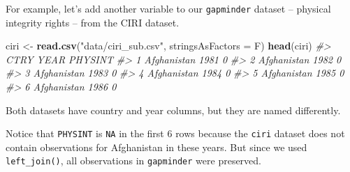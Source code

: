 \documentclass[]{book}
\newenvironment{Shaded}{\begin{snugshade}}{\end{snugshade}}
\newcommand{\KeywordTok}[1]{\textcolor[rgb]{0.13,0.29,0.53}{\textbf{#1}}}
\newcommand{\DataTypeTok}[1]{\textcolor[rgb]{0.13,0.29,0.53}{#1}}
\newcommand{\StringTok}[1]{\textcolor[rgb]{0.31,0.60,0.02}{#1}}
\newcommand{\CommentTok}[1]{\textcolor[rgb]{0.56,0.35,0.01}{\textit{#1}}}
\newcommand{\OperatorTok}[1]{\textcolor[rgb]{0.81,0.36,0.00}{\textbf{#1}}}
\newcommand{\NormalTok}[1]{#1}
\begin{document}
For example, let's add another variable to our \texttt{gapminder}
dataset -- physical integrity rights -- from the CIRI dataset.

\begin{Shaded}
\begin{Highlighting}[]
\NormalTok{ciri <-}\StringTok{ }\KeywordTok{read.csv}\NormalTok{(}\StringTok{"data/ciri_sub.csv"}\NormalTok{, }\DataTypeTok{stringsAsFactors =}\NormalTok{ F)}
\KeywordTok{head}\NormalTok{(ciri)}
\CommentTok{#>          CTRY YEAR PHYSINT}
\CommentTok{#> 1 Afghanistan 1981       0}
\CommentTok{#> 2 Afghanistan 1982       0}
\CommentTok{#> 3 Afghanistan 1983       0}
\CommentTok{#> 4 Afghanistan 1984       0}
\CommentTok{#> 5 Afghanistan 1985       0}
\CommentTok{#> 6 Afghanistan 1986       0}
\end{Highlighting}
\end{Shaded}

Both datasets have country and year columns, but they are named
differently.

\begin{Shaded}
\end{Shaded}

Notice that \texttt{PHYSINT} is \texttt{NA} in the first 6 rows because
the \texttt{ciri} dataset does not contain observations for Afghanistan
in these years. But since we used \texttt{left\_join()}, all
observations in \texttt{gapminder} were preserved.
\end{document}
